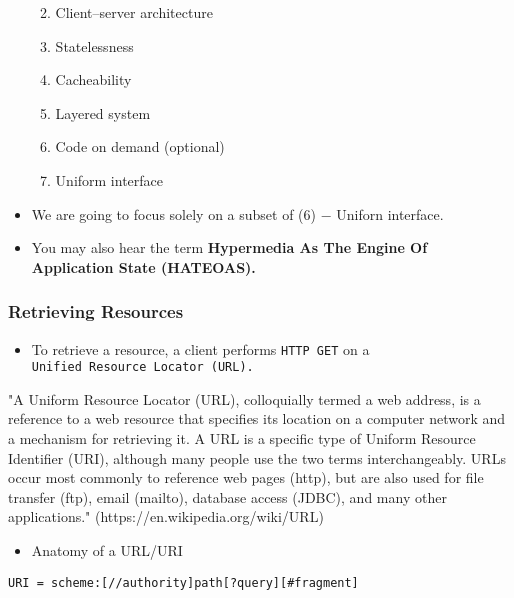\documentclass[11pt]{article}
\providecommand{\tightlist}{%
      \setlength{\itemsep}{0pt}\setlength{\parskip}{0pt}}
\begin{document}
\begin{itemize}
  \begin{enumerate}
  \def\labelenumi{\arabic{enumi}.}
  \tightlist
  \item
    Client--server architecture
  \item
    Statelessness
  \item
    Cacheability
  \item
    Layered system
  \item
    Code on demand (optional)
  \item
    Uniform interface
  \end{enumerate}
\item
  We are going to focus solely on a subset of (6) \(-\) Uniforn
  interface.
\item
  You may also hear the term \textbf{Hypermedia As The Engine Of
  Application State (HATEOAS).}
\end{itemize}

    \subsubsection{Retrieving Resources}\label{retrieving-resources}

\begin{itemize}
\tightlist
\item
  To retrieve a resource, a client performs \texttt{HTTP\ GET} on a
  \texttt{Unified\ Resource\ Locator\ (URL).}
\end{itemize}

"A Uniform Resource Locator (URL), colloquially termed a web address, is
a reference to a web resource that specifies its location on a computer
network and a mechanism for retrieving it. A URL is a specific type of
Uniform Resource Identifier (URI), although many people use the two
terms interchangeably. URLs occur most commonly to reference web pages
(http), but are also used for file transfer (ftp), email (mailto),
database access (JDBC), and many other applications."
(https://en.wikipedia.org/wiki/URL)

\begin{itemize}
\tightlist
\item
  Anatomy of a URL/URI
\end{itemize}

\begin{verbatim}
URI = scheme:[//authority]path[?query][#fragment]
\end{verbatim}
\end{document}
